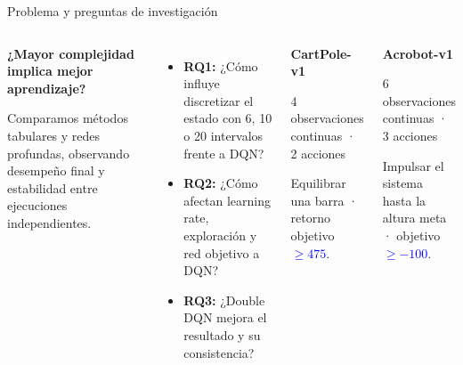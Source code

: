 \documentclass[aspectratio=169,10pt]{beamer}
\begin{document}
\begin{frame}{Problema y preguntas de investigación}
\begin{columns}[T,onlytextwidth]
\begin{info}
\textbf{¿Mayor complejidad implica mejor aprendizaje?}\par\vspace{.09cm}
\small Comparamos métodos tabulares y redes profundas, observando desempeño final y estabilidad entre ejecuciones independientes.
\end{info}
\vspace{.16cm}
\begin{itemize}\setlength{\itemsep}{.10cm}
\item \textbf{RQ1:} ¿Cómo influye discretizar el estado con 6, 10 o 20 intervalos frente a DQN?
\item \textbf{RQ2:} ¿Cómo afectan learning rate, exploración y red objetivo a DQN?
\item \textbf{RQ3:} ¿Double DQN mejora el resultado y su consistencia?
\end{itemize}
\begin{info}
{\large\bfseries CartPole-v1}\par\vspace{.08cm}
\small 4 observaciones continuas · 2 acciones\par
\small Equilibrar una barra · retorno objetivo \textbf{\textcolor{Blue}{$\geq475$}}.
\end{info}
\vspace{.15cm}
\begin{info}
{\large\bfseries Acrobot-v1}\par\vspace{.08cm}
\small 6 observaciones continuas · 3 acciones\par
\small Impulsar el sistema hasta la altura meta · objetivo \textbf{\textcolor{Blue}{$\geq-100$}}.
\end{info}
\end{columns}

\end{frame}
\end{document}
